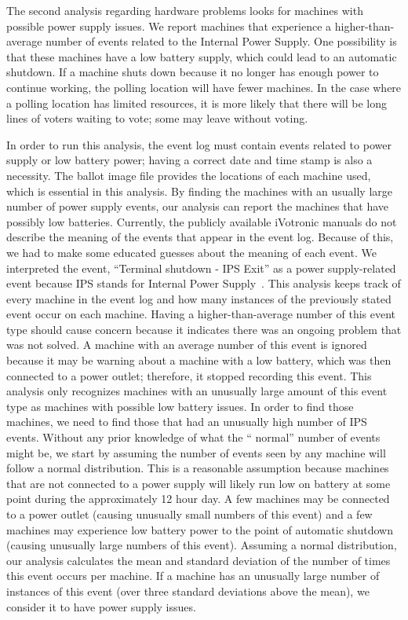 The second analysis regarding hardware problems looks for machines with possible power supply issues.  We report machines that experience a higher-than-average number of events related to the Internal Power Supply. One possibility is that these machines have a low battery supply, which could lead to an automatic shutdown.  If a machine shuts down because it no longer has enough power to continue working, the polling location will have fewer machines.  In the case where a polling location has limited resources, it is more likely that there will be long lines of voters waiting to vote; some may leave without voting.  

In order to run this analysis, the event log must contain events related to
power supply or low battery power; having a correct date and time stamp is also
a necessity.  The ballot image file provides the locations of each machine used,
which is essential in this analysis.  By finding the machines with an usually
large number of power supply events, our analysis can report the machines that
have possibly low batteries.  Currently, the publicly available iVotronic
manuals do not describe the meaning of the events that appear in the event log.
Because of this, we had to make some educated guesses about the meaning of each
event.  We interpreted the event, \textquotedblleft Terminal shutdown - IPS
Exit\textquotedblright \hspace{1 mm} as a power supply-related event because IPS
stands for Internal Power Supply~\cite{email2010}.  This analysis keeps track of
every machine in the event log and how many instances of the previously stated
event occur on each machine.  Having a higher-than-average number of this event
type should cause concern because it indicates there was an ongoing problem that
was not solved. A machine with an average number of this event is ignored
because it may be warning about a machine with a low battery, which was then
connected to a power outlet; therefore, it stopped recording this event. This
analysis only recognizes machines with an unusually large amount of this event
type as machines with possible low battery issues. In order to find those
machines, we need to find those that had an unusually high number of IPS
events. Without any prior knowledge of what the \textquotedblleft
normal\textquotedblright \hspace{1 mm} number of events might be, we start by
assuming the number of events seen by any machine will follow a normal
distribution. This is a reasonable assumption because machines that are not
connected to a power supply will likely run low on battery at some point during
the approximately 12 hour day. A few machines may be connected to a power outlet
(causing unusually small numbers of this event) and a few machines may
experience low battery power to the point of automatic shutdown (causing
unusually large numbers of this event).  Assuming a normal distribution, our
analysis calculates the mean and standard deviation of the number of times this
event occurs per machine.  If a machine has an unusually large number of
instances of this event (over three standard deviations above the mean), we
consider it to have power supply issues.

